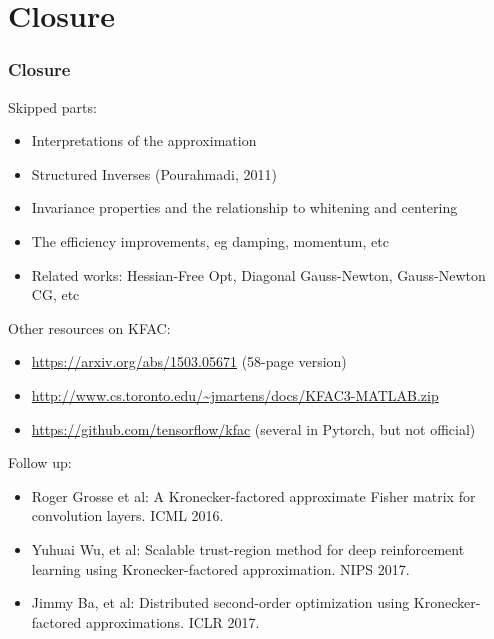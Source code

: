 \section{Closure}

\begin{frame}
\frametitle{Closure}
{\footnotesize

Skipped parts:
\begin{itemize}
\item Interpretations of the approximation
\item Structured Inverses (Pourahmadi, 2011)
\item Invariance properties and the relationship to whitening and centering
\item The efficiency improvements, eg damping, momentum, etc
\item Related works: Hessian-Free Opt, Diagonal Gauss-Newton, Gauss-Newton CG, etc
\end{itemize}

Other resources on KFAC:
\begin{itemize}
\item \url{https://arxiv.org/abs/1503.05671} (58-page version)
\item \url{http://www.cs.toronto.edu/~jmartens/docs/KFAC3-MATLAB.zip}
\item \url{https://github.com/tensorflow/kfac} (several in Pytorch, but not official)
\end{itemize}

Follow up:
\begin{itemize}
\item Roger Grosse et al: A Kronecker-factored approximate Fisher matrix for convolution layers. ICML 2016.
\item Yuhuai Wu, et al: Scalable trust-region method for deep reinforcement learning using Kronecker-factored approximation. NIPS 2017.
\item Jimmy Ba, et al: Distributed second-order optimization using Kronecker-factored approximations. ICLR 2017.
\end{itemize}

}
\end{frame}

